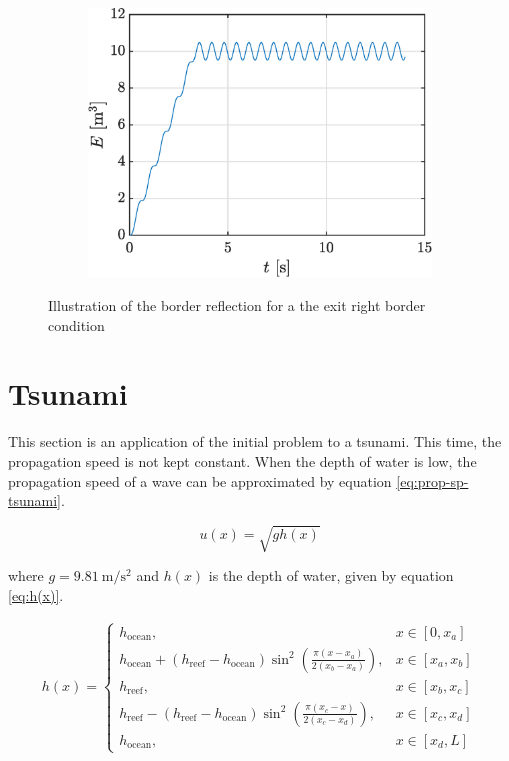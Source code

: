 \documentclass[a4paper,12pt,twoside]{article}
\newcommand{\bracket}[1]{\left(#1\right)}
\newcommand{\sqbracket}[1]{\left[#1\right]}
\begin{document}
\begin{figure}[h!]
    \centering
    \begin{subfigure}{0.5\textwidth}
    \includegraphics[width=\textwidth]{graphs/ex1Esortie.eps}
    \end{subfigure}

    \caption{Illustration of the border reflection for a the exit right border condition}
    \label{fig:ex1sor}
    \end{figure}
    
    \section{Tsunami}
      This section is an application of the initial problem to a tsunami.
      This time, the propagation speed is not kept constant.
      When the depth of water is low, the propagation speed of a wave can be approximated by equation \eqref{eq:prop-sp-tsunami}.

      \begin{equation}
        u\bracket{x} = \sqrt{gh\bracket{x}}
        \label{eq:prop-sp-tsunami}
      \end{equation}

      where $g=\SI{9.81}{\meter\per\square\second}$ and $h\bracket{x}$ is the depth of water, given by equation \eqref{eq:h(x)}.

      \begin{align}
        h(x)=
        \begin{cases}
          h_\text{ocean}, &x\in\sqbracket{0,x_a} \\
          h_\text{ocean} + \bracket{h_\text{reef} - h_\text{ocean}}\sin^2\bracket{\frac{\pi\bracket{x-x_a}}{2\bracket{x_b-x_a}}}, &x\in\sqbracket{x_a,x_b} \\
          h_\text{reef}, &x\in\sqbracket{x_b,x_c} \\
          h_\text{reef} - \bracket{h_\text{reef} - h_\text{ocean}}\sin^2\bracket{\frac{\pi\bracket{x_c - x}}{2\bracket{x_c-x_d}}}, &x\in\sqbracket{x_c,x_d} \\
          h_\text{ocean}, &x\in\sqbracket{x_d, L}
        \end{cases}
        \label{eq:h(x)}
      \end{align}
\end{document}
